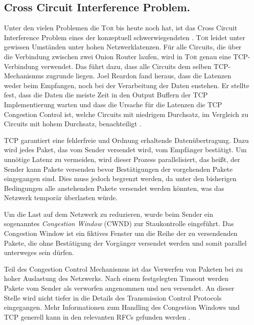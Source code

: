 \documentclass[fleqn,envcountsame,runningheads,10pt,a4paper]{llncs}
\begin{document}
\subsection{Cross Circuit Interference Problem.}
\label{sec:crosscircuitinterference} 

Unter den vielen Problemen die \textsc{Tor} bis heute noch hat, ist das Cross Circuit Interference Problem eines der konzeptuell schwerwiegendsten \cite{tor_improvements}.
\textsc{Tor} leidet unter gewissen Umständen unter hohen Netzwerklatenzen.
Für alle Circuits, die über die Verbindung zwischen zwei Onion Router laufen, wird in \textsc{Tor} genau eine TCP-Verbindung verwendet.
Das führt dazu, dass alle Circuits dem selben TCP-Mechanismus zugrunde liegen.
Joel Reardon fand heraus, dass die Latenzen weder beim Empfangen, noch bei der Verarbeitung der Daten enstehen.
Er stellte fest, dass die Daten die meiste Zeit in den Output Buffern der TCP Implementierung warten und dass die Ursache für die Latenzen die TCP Congestion Control ist, welche Circuits mit niedrigem Durchsatz, im Vergleich zu Circuits mit hohem Durchsatz, benachteiligt \cite{tcp-over-dtls-thesis,tcp-over-dtls}.

TCP garantiert eine fehlerfreie und Ordnung erhaltende Datenübertragung. Dazu wird jedes Paket, das vom Sender versendet wird, vom Empfänger bestätigt.
Um unnötige Latenz zu vermeiden, wird dieser Prozess parallelisiert, das heißt, der Sender kann Pakete versenden bevor Bestätigungen der vorgehenden Pakete eingegangen sind. Dies muss jedoch begrenzt werden, da unter den bisherigen Bedingungen alle anstehenden Pakete versendet werden könnten, was das Netzwerk temporär überlasten würde.

Um die Last auf dem Netzwerk zu reduzieren, wurde beim Sender ein sogenanntes \textit{Congestion Window} (CWND) zur Staukontrolle eingeführt. Das Congestion Window ist ein fiktives Fenster um die Reihe der zu versendenden Pakete, die ohne Bestätigung der Vorgänger versendet werden und somit parallel unterweges sein dürfen.

Teil des Congestion Control Mechanismus ist das Verwerfen von Paketen bei zu hoher Auslastung des Netzwerks. Nach einem festgelegten Timeout werden Pakete vom Sender als verworfen angenommen und neu versendet. An dieser Stelle wird nicht tiefer in die Details des Transmission Control Protocols eingegangen. Mehr Informationen zum Handling des Congestion Windows und TCP generell kann in den relevanten RFCs gefunden werden \cite{rfc:tcp, rfc:tcpcc}.
\end{document}
